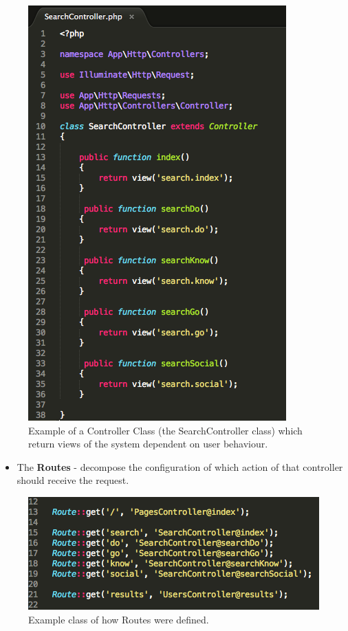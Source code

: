 \documentclass[a4paper, 11pt]{article}
\begin{document}
\begin{figure}[H]
\begin{center}
\includegraphics[scale=0.55]{controllers}
\caption{Example of a Controller Class (the SearchController class) which return views of the system dependent on user behaviour.}
\label{controller}
\end{center}
\end{figure}


\begin{itemize}
\item{The \textbf{Routes} - decompose the configuration of which action of that controller should receive the request.} 
\end{itemize}

\begin{figure}[H]
\begin{center}
\includegraphics[scale=0.65]{routes}
\caption{Example class of how Routes were defined.}
\label{routes}
\end{center}
\end{figure}
\end{document}
